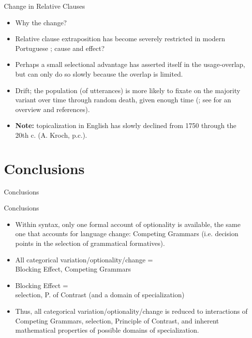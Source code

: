 \documentclass[hyperref={pdfpagelabels=false}]{beamer}
\begin{document}
\begin{frame}{Change in Relative Clauses}
\begin{itemize}
	\item Why the change? 
	\item Relative clause extraposition has become severely restricted in modern Portuguese \citep{cardoso2011, cardoso2012}; cause and effect?
	\item Perhaps a small selectional advantage has asserted itself in the usage-overlap, but can only do so slowly because the overlap is limited.
	\item Drift; the population (of utterances) is more likely to fixate on the majority variant over time through random death, given enough time (\citealt{moran1958}; see \citealt{nowak2006} for an overview and references).
	\item \textbf{Note:} topicalization in English has slowly declined from 1750 through the 20th c. (A. Kroch, p.c.).
\end{itemize}
\end{frame}


\section{Conclusions}
\begin{frame}{Conclusions}
	\begin{block}{Conclusions}
		\begin{itemize}
			\item Within syntax, only one formal account of optionality is available, the same one that accounts for language change: Competing Grammars (i.e. decision points in the selection of grammatical formatives).
			\item All categorical variation/optionality/change = \\Blocking Effect, Competing Grammars
			\item Blocking Effect = \\
			selection, P. of Contrast (and a domain of specialization)
			\item Thus, all categorical variation/optionality/change is reduced to interactions of Competing Grammars, selection, Principle of Contrast, and inherent mathematical properties of possible domains of specialization.
				\end{itemize}
	\end{block}
\end{frame}
\end{document}
